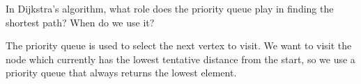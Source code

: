 In Dijkstra's algorithm, what role does the priority queue play in finding the shortest path?
When do we use it?

    \begin{answer}
    The priority queue is used to select the next vertex to visit. We want to
    visit the node which currently has the lowest tentative distance from the
    start, so we use a priority queue that always returns the lowest element.
    \end{answer}